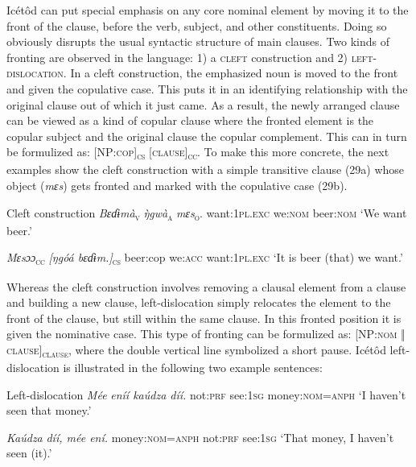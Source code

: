 \begin{table}
Icétôd can put special emphasis on any core nominal element by moving it to the front of the clause, before the verb, subject, and other constituents. Doing so obviously disrupts the usual syntactic structure of main clauses. Two kinds of fronting are observed in the language: 1) a \textsc{cleft} construction and 2) \textsc{left-dislocation}. In a cleft construction, the emphasized noun is moved to the front and given the copulative case. This puts it in an identifying relationship with the original clause out of which it just came. As a result, the newly arranged clause can be viewed as a kind of copular clause where the fronted element is the copular subject and the original clause the copular complement. This can in turn be formulized as: [NP:\textsc{cop}]\textsc{\textsubscript{cs}}\textsc{ [clause]}\textsc{\textsubscript{cc}}. To make this more concrete, the next examples show the cleft construction with a simple transitive clause (29a) whose object (\textit{mɛs}) gets fronted and marked with the copulative case (29b). 




Cleft construction
\textit{Bɛɗɨmà}\textsc{\textsubscript{v}}    \textit{\`{ŋ}gwà}\textsc{\textsubscript{a}}\textit{    mɛs}\textsc{\textsubscript{o}}.
want:\textsc{1pl.exc}   we:\textsc{nom}  beer:\textsc{nom}
‘We want beer.’




\textit{Mɛsɔɔ}\textsc{\textsubscript{cc}}     \textit{[ŋgóá    bɛɗɨm.]}\textsc{\textsubscript{cs}}
beer:cop    we:\textsc{acc}   want:\textsc{1pl.exc}   
‘It is beer (that) we want.’


Whereas the cleft construction involves removing a clausal element from a clause and building a new clause, left-dislocation simply relocates the element to the front of the clause, but still within the same clause. In this fronted position it is given the nominative case. This type of fronting can be formulized as: [NP:\textsc{nom }\textsc{‖}\textsc{ clause]}\textsc{\textsubscript{clause}}, where the double vertical line symbolized a short pause. Icétôd left-dislocation is illustrated in the following two example sentences:




Left-dislocation
\textit{Mée}   \textit{eníí     kaúdza díí.}
not:\textsc{prf}   see:\textsc{1sg}   money:\textsc{nom}=\textsc{anph}
‘I haven’t seen that money.’




\textit{Kaúdza} \textit{díí,     mée     ení.}
money:\textsc{nom}=\textsc{anph}   not:\textsc{prf}   see:\textsc{1sg}
‘That money, I haven’t seen (it).’







\end{table}
